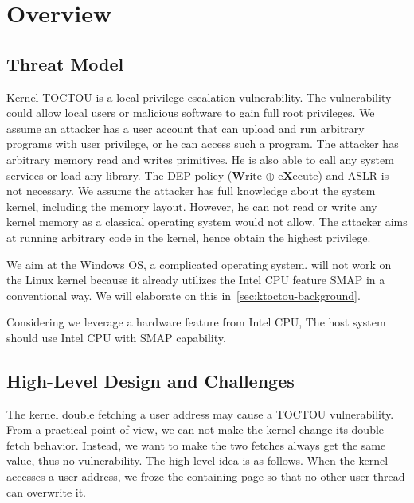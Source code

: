 \section{Overview}
\label{sec:ktoctou-overview}




\subsection{Threat Model}
\label{sec:ktoctou-threatmodel}

Kernel TOCTOU is a local privilege escalation vulnerability. The vulnerability could allow local users or malicious software to gain full root privileges. We assume an attacker has a user account that can upload and run arbitrary programs with user privilege, or he can access such a program. The attacker has arbitrary memory read and writes primitives. He is also able to call any system services or load any library. The DEP policy (\textbf{W}rite $\oplus$ e\textbf{X}ecute) and ASLR is not necessary. We assume the attacker has full knowledge about the system kernel, including the memory layout. However, he can not read or write any kernel memory as a classical operating system would not allow. The attacker aims at running arbitrary code in the kernel, hence obtain the highest privilege. 

We aim at the Windows OS, a complicated operating system. \name will not work on the Linux kernel because it already utilizes the Intel CPU feature SMAP in a conventional way. We will elaborate on this in~\autoref{sec:ktoctou-background}.


Considering we leverage a hardware feature from Intel CPU, The host system should use Intel CPU with SMAP capability.


\subsection{High-Level Design and Challenges}

The kernel double fetching a user address may cause a TOCTOU vulnerability. From a practical point of view, we can not make the kernel change its double-fetch behavior. Instead, we want to make the two fetches always get the same value, thus no vulnerability. The high-level idea is as follows.  When the kernel accesses a user address, we froze the containing page so that no other user thread can overwrite it.



